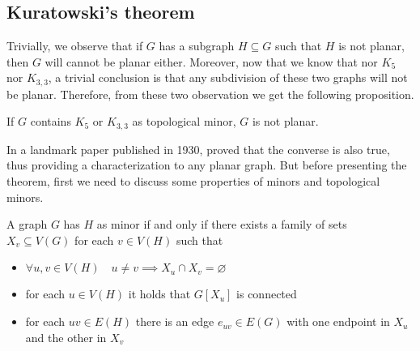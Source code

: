 \documentclass[a4paper, 12pt]{report}
\begin{document}
    \subsection{Kuratowski's theorem}

    Trivially, we observe that if $G$ has a subgraph $H \subseteq G$ such that $H$ is not planar, then $G$ will cannot be planar either. Moreover, now that we know that nor $K_5$ nor $K_{3,3}$, a trivial conclusion is that any subdivision of these two graphs will not be planar. Therefore, from these two observation we get the following proposition.

    \begin{framedlem}[label={kurat}]{}
        If $G$ contains $K_5$ or $K_{3,3}$ as topological minor, $G$ is not planar.
    \end{framedlem}

    In a landmark paper published in 1930, \textcite{kuratowski} proved that the converse is also true, thus providing a  characterization to any planar graph. But before presenting the theorem, first we need to discuss some properties of minors and topological minors.

    \begin{framedprop}[label={minor alt def}]{}
        A graph $G$ has $H$ as minor if and only if there exists a family of sets $X_v \subseteq V(G)$ for each $v \in V(H)$ such that

        \begin{itemize}
            \item $\forall u, v \in V(H) \quad u \neq v \implies X_u \cap X_v = \varnothing$
            \item for each $u \in V(H)$ it holds that $G[X_u]$ is connected
            \item for each $uv \in E(H)$ there is an edge $e_{uv} \in E(G)$ with one endpoint in $X_u$ and the other in $X_v$
        \end{itemize}
    \end{framedprop}
\end{document}
